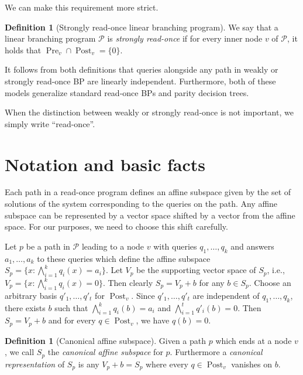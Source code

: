 \documentclass[a4paper,11pt,draft]{article}
\theoremstyle{definition}
\newtheorem{definition}[theorem]{Definition}
\theoremstyle{remark}
\DeclareMathOperator{\pre}{Pre}
\DeclareMathOperator{\post}{Post}
\newcommand{\Q}{{\{0,1\}}}
\newcommand{\calP}{\mathcal{P}}
\newcommand{\sreadonce}{strongly read-once}
\newcommand{\Sreadonce}{Strongly read-once}
\newcommand{\readonce}{read-once}
\begin{document}
We can make this requirement more strict.

\begin{definition}[\Sreadonce{} linear branching program]
We say that a linear branching program $\calP$ is \emph{\sreadonce} if for every inner node $v$ of $\calP$, it holds that $\pre_v \cap \post_v = \{0\}$.
\end{definition}

It follows from both definitions that queries alongside any path in weakly or strongly read-once BP are linearly independent. Furthermore, both of these models generalize standard read-once BPs and parity decision trees.

When the distinction between weakly or strongly read-once is not important, we simply write ``read-once''.



\section{Notation and basic facts}

Each path in a \readonce{} program defines an affine subspace given by the set of solutions of the system corresponding to the queries on the path. Any affine subspace can be represented by a vector space shifted by a vector from the affine space. For our purposes, we need to choose this shift carefully. 

Let $p$ be a path in $\calP$ leading to a node $v$ with queries $q_1, \ldots, q_k$ and answers $a_1, \ldots, a_k$ to these queries which define the affine subspace $S_p = \{x:\bigwedge_{i=1}^k q_i(x) = a_i\}$. Let $V_p$ be the supporting vector space of $S_p$, i.e., $V_p = \{x : \bigwedge_{i = 1}^k q_i(x) = 0\}$. Then clearly $S_p = V_p + b$ for any $b \in S_p$. Choose an arbitrary basis $q'_1, \ldots, q'_t$ for $\post_v$. Since $q'_1, \ldots, q'_t$ are independent of $q_1, \ldots, q_k$, there exists $b$ such that $\bigwedge_{i=1}^k q_i(b) = a_i$ and $\bigwedge_{i = 1}^t q'_i(b) = 0$. Then $S_p = V_p + b$ and for every $q \in \post_v$, we have $q(b) = 0$.

\begin{definition}[Canonical affine subspace] 
Given a path $p$ which ends at a node $v$, we call $S_p$ the \emph{canonical affine subspace} for $p$. Furthermore a \emph{canonical representation} of $S_p$ is any $V_p + b = S_p$ where every $q \in \post_v$ vanishes on $b$.
\end{definition}
\end{document}
